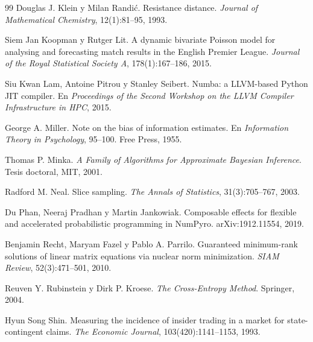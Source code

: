 \begin{thebibliography}{99}
 Douglas J. Klein y Milan Randić. Resistance distance. \emph{Journal of Mathematical Chemistry}, 12(1):81--95, 1993.

 Siem Jan Koopman y Rutger Lit. A dynamic bivariate Poisson model for analysing and forecasting match results in the English Premier League. \emph{Journal of the Royal Statistical Society A}, 178(1):167--186, 2015.

 Siu Kwan Lam, Antoine Pitrou y Stanley Seibert. Numba: a LLVM-based Python JIT compiler. En \emph{Proceedings of the Second Workshop on the LLVM Compiler Infrastructure in HPC}, 2015.

 George A. Miller. Note on the bias of information estimates. En \emph{Information Theory in Psychology}, 95--100. Free Press, 1955.

 Thomas P. Minka. \emph{A Family of Algorithms for Approximate Bayesian Inference}. Tesis doctoral, MIT, 2001.

 Radford M. Neal. Slice sampling. \emph{The Annals of Statistics}, 31(3):705--767, 2003.

 Du Phan, Neeraj Pradhan y Martin Jankowiak. Composable effects for flexible and accelerated probabilistic programming in NumPyro. arXiv:1912.11554, 2019.

 Benjamin Recht, Maryam Fazel y Pablo A. Parrilo. Guaranteed minimum-rank solutions of linear matrix equations via nuclear norm minimization. \emph{SIAM Review}, 52(3):471--501, 2010.

 Reuven Y. Rubinstein y Dirk P. Kroese. \emph{The Cross-Entropy Method}. Springer, 2004.

 Hyun Song Shin. Measuring the incidence of insider trading in a market for state-contingent claims. \emph{The Economic Journal}, 103(420):1141--1153, 1993.

\end{thebibliography}
